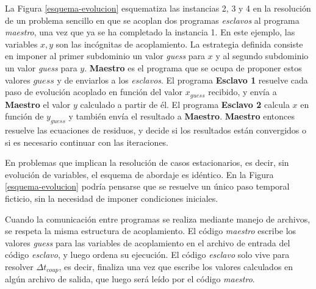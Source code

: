 La Figura \ref{esquema-evolucion} esquematiza las instancias 2, 3 y 4 en la resolución de un problema sencillo
en que se acoplan dos programas \textit{esclavos} al programa \textit{maestro},
una vez que ya se ha completado la instancia 1.
En este ejemplo, las variables $x,y$ son las incógnitas de acoplamiento.
La estrategia definida consiste en imponer al primer subdominio un valor \textit{guess} para $x$ y al segundo subdominio un valor \textit{guess} para $y$.
\textbf{Maestro} es el programa que se ocupa de proponer estos valores $guess$ y de enviarlos a los \textit{esclavos}.
El programa \textbf{Esclavo 1} resuelve cada paso de evolución acoplado en función del valor $x_{guess}$ recibido, y envía a \textbf{Maestro} el valor $y$ calculado a partir de él.
El programa \textbf{Esclavo 2} calcula $x$ en función de $y_{guess}$ y también envía el resultado a \textbf{Maestro}.
\textbf{Maestro} entonces resuelve las ecuaciones de residuos, y decide si los resultados están convergidos o si es necesario continuar con las iteraciones.

En problemas que implican la resolución de casos estacionarios, es decir, sin evolución de variables, el esquema de abordaje es idéntico.
En la Figura \ref{esquema-evolucion} podría pensarse que se resuelve un único paso temporal ficticio, sin la necesidad de imponer condiciones iniciales.

Cuando la comunicación entre programas se realiza mediante manejo de archivos, se respeta la misma estructura de acoplamiento.
El código \textit{maestro} escribe los valores \textit{guess} para las variables de acoplamiento en el archivo de entrada del código \textit{esclavo}, y luego ordena su ejecución.
El código \textit{esclavo} solo vive para resolver $\Delta t_{coup}$, es decir, finaliza una vez que escribe los valores calculados en algún archivo de salida,
que luego será leído por el código \textit{maestro}.

